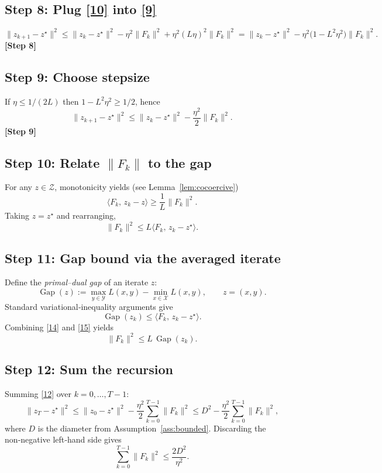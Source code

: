\documentclass{article}
\newcommand{\gap}{\operatorname{Gap}}
\begin{document}
\subsection*{Step 8: Plug \eqref{10} into \eqref{9}}
\[
\|z_{k+1}-z^{\star}\|^{2}
\le \|z_k-z^{\star}\|^{2}
-\eta^{2}\|F_k\|^{2}
+ \eta^{2}(L\eta)^{2}\|F_k\|^{2}
= \|z_k-z^{\star}\|^{2}
-\eta^{2}\bigl(1-L^{2}\eta^{2}\bigr)\|F_k\|^{2}.
\tag{11}
\]
\textbf{[Step 8]}

\subsection*{Step 9: Choose stepsize}
If $\eta\le 1/(2L)$ then $1-L^{2}\eta^{2}\ge 1/2$, hence
\[
\|z_{k+1}-z^{\star}\|^{2}
\le \|z_k-z^{\star}\|^{2}
-\frac{\eta^{2}}{2}\|F_k\|^{2}.
\tag{12}
\]
\textbf{[Step 9]}

\subsection*{Step 10: Relate $\|F_k\|$ to the gap}
For any $z\in\mathcal Z$, monotonicity yields (see Lemma~\ref{lem:cocoercive})
\[
\langle F_k,\,z_k-z\rangle\ge \frac{1}{L}\|F_k\|^{2}.
\tag{13}
\]
Taking $z=z^{\star}$ and rearranging,
\[
\|F_k\|^{2}\le L\langle F_k,\,z_k-z^{\star}\rangle.
\tag{14}
\]

\subsection*{Step 11: Gap bound via the averaged iterate}
Define the \emph{primal–dual gap} of an iterate $z$:
\[
\gap(z):=\max_{y\in\mathcal Y}L(x,y)-\min_{x\in\mathcal X}L(x,y),\qquad
z=(x,y).
\]
Standard variational‑inequality arguments give
\[
\gap(z_k)\le \langle F_k,\,z_k-z^{\star}\rangle.
\tag{15}
\]
Combining \eqref{14} and \eqref{15} yields
\[
\|F_k\|^{2}\le L\,\gap(z_k).
\tag{16}
\]

\subsection*{Step 12: Sum the recursion}
Summing \eqref{12} over $k=0,\dots,T-1$:
\[
\|z_T-z^{\star}\|^{2}
\le \|z_0-z^{\star}\|^{2}
-\frac{\eta^{2}}{2}\sum_{k=0}^{T-1}\|F_k\|^{2}
\le D^{2}
-\frac{\eta^{2}}{2}\sum_{k=0}^{T-1}\|F_k\|^{2},
\tag{17}
\]
where $D$ is the diameter from Assumption~\ref{ass:bounded}.
Discarding the non‑negative left‑hand side gives
\[
\sum_{k=0}^{T-1}\|F_k\|^{2}\le \frac{2D^{2}}{\eta^{2}}.
\tag{18}
\]
\end{document}
